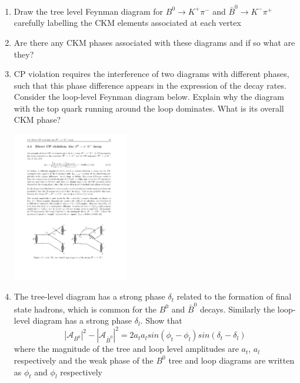 \begin{enumerate}
\item Draw the tree level Feynman diagram for $B^0\to K^+\pi^-$
and $\bar{B}^0\to K^-\pi^+$ carefully labelling the CKM elements associated at each vertex
\item Are there any CKM phases associated with these diagrams and if so what are they?
\item CP violation requires the interference of two diagrams with different phases, such that this phase difference appears in the expression of the decay rates. Consider the loop-level Feynman diagram below. Explain why the diagram with the top quark running around the loop dominates. What is its overall CKM phase?
\begin{center}
\includegraphics[width=0.4\textwidth]{problemsheets/fig/b_kpi_penguin.pdf}
\end{center}
\item The tree-level diagram has a strong phase $\delta_t$ related to the formation of final state hadrons, which is common for the $B^0$ and $\bar{B}^0$ decays. Similarly the loop-level diagram has a strong phase $\delta_l$. Show that
\[|\mathcal{A}_{B^0}|^2-|\mathcal{A}_{\bar{B}^0}|^2=2a_{t}a_{l}sin(\phi_t-\phi_l)sin(\delta_t-\delta_l)\]
where the magnitude of the tree and loop level amplitudes are $a_t$, $a_l$ respectively and the weak phase of the $B^0$ tree and loop diagrams are written as $\phi_t$ and $\phi_l$ respectively
\end{enumerate}

